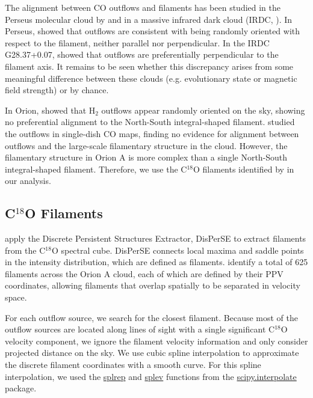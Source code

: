 \documentclass[twocolumn]{aastex63}
\begin{document}
The alignment between CO outflows and filaments has been studied in the Perseus molecular cloud by \citet{Stephens17} and in a massive infrared dark cloud (IRDC, \citealp{Kong19}). In Perseus, \citet{Stephens17} showed that outflows are consistent with being randomly oriented with respect to the filament, neither parallel nor perpendicular. In the IRDC G28.37+0.07, \cite{Kong19} showed that outflows are preferentially perpendicular to the filament axis. It remains to be seen whether this discrepancy arises from some meaningful difference between these clouds (e.g. evolutionary state or magnetic field strength) or by chance.

In Orion, \citet{Davis09} showed that H$_{2}$ outflows appear randomly oriented on the sky, showing no preferential alignment to the North-South integral-shaped filament. \citet{Tanabe:submitted} studied the outflows in single-dish CO maps, finding no evidence for alignment between outflows and the large-scale filamentary structure in the cloud. However, the filamentary structure in Orion A is more complex than a single North-South integral-shaped filament. Therefore, we use the C$^{18}$O filaments identified by \citet{Suri19} in our analysis.

\subsection{C$^{18}$O Filaments}
\citet{Suri19} apply the Discrete Persistent Structures Extractor, DisPerSE \citep{Sousbie11} to extract filaments from the C$^{18}$O spectral cube. DisPerSE connects local maxima and saddle points in the intensity distribution, which are defined as filaments. \citet{Suri19} identify a total of 625 filaments across the Orion A cloud, each of which are defined by their PPV coordinates, allowing filaments that overlap spatially to be separated in velocity space. 

For each outflow source, we search for the closest filament. Because most of the outflow sources are located along lines of sight with a single significant C$^{18}$O velocity component, we ignore the filament velocity information and only consider projected distance on the sky. We use cubic spline interpolation to approximate the discrete filament coordinates with a smooth curve. For this spline interpolation, we used the \url{splrep} and \url{splev} functions from the \url{scipy.interpolate} package. %
\end{document}
